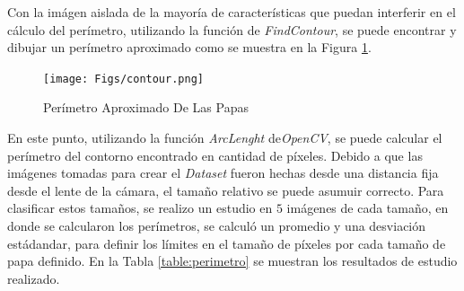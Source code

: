 	Con la imágen aislada de la mayoría de características que puedan interferir en el cálculo del perímetro, utilizando la función de \textit{FindContour}, se puede encontrar y dibujar un perímetro aproximado como se muestra en la Figura \ref{fig:contour}.
	
	\begin{figure}[ht]
		\centering
		\texttt{[image: Figs/contour.png]}
		\caption{Perímetro Aproximado De Las Papas}
		\label{fig:contour}
	\end{figure}
	
	En este punto, utilizando la función \textit{ArcLenght} de\textit{OpenCV}, se puede calcular el perímetro del contorno encontrado en cantidad de píxeles. Debido a que las imágenes tomadas para crear el \textit{Dataset} fueron hechas desde una distancia fija desde el lente de la cámara, el tamaño relativo se puede asumuir correcto. Para clasificar estos tamaños, se realizo un estudio en $5$ imágenes de cada tamaño, en donde se calcularon los perímetros, se calculó un promedio y una desviación estádandar, para definir los límites en el tamaño de píxeles por cada tamaño de papa definido. En la Tabla \ref{table:perimetro} se muestran los resultados de estudio realizado.
	
